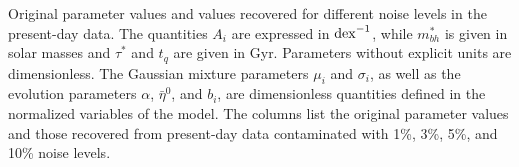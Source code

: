 \begin{table}[h!]
\caption{
Original parameter values and values recovered for different noise levels in the present-day data. 
The quantities $A_i$ are expressed in ${\rm dex}^{-1}$, while $m_{bh}^{*}$ is given in solar masses and 
$\tau^{*}$ and $t_q$ are given in Gyr. Parameters without explicit units are dimensionless. 
The Gaussian mixture parameters $\mu_i$ and $\sigma_i$, as well as the evolution parameters 
$\alpha$, $\bar{\eta}^{0}$, and $b_i$, are dimensionless quantities defined in the normalized 
variables of the model. The columns list the original parameter values and those recovered from 
present-day data contaminated with 1\%, 3\%, 5\%, and 10\% noise levels.
}

\label{tab:params_recovered}
\end{table}